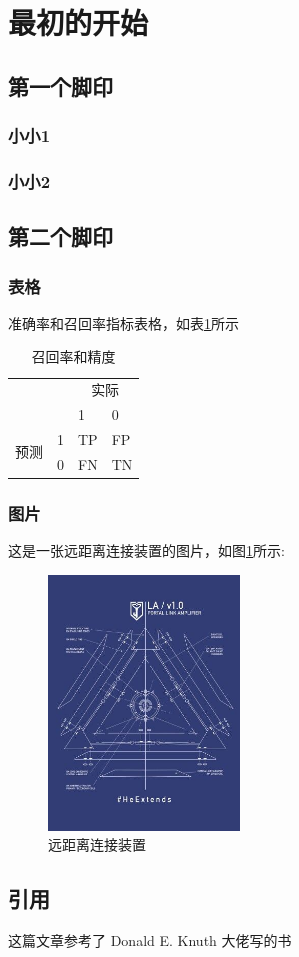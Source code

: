 \section{最初的开始}
\songti
\subsection{第一个脚印}

\subsubsection{小小1}
\subsubsection{小小2}

\subsection{第二个脚印}

\subsubsection{表格}
准确率和召回率指标表格，如表\ref{f1score}所示
\begin{table}[H]
\centering
\begin{tabular}{|ll|ll|}
\hline
\multicolumn{2}{|l|}{\multirow{2}{*}{}}       & \multicolumn{2}{c|}{实际}      \\ \cline{3-4} 
\multicolumn{2}{|l|}{}                        & \multicolumn{1}{l|}{1}  & 0  \\ \hline
\multicolumn{1}{|r|}{\multirow{2}{*}{预测}} & 1 & \multicolumn{1}{l|}{TP} & FP \\ \cline{2-4} 
\multicolumn{1}{|r|}{}                    & 0 & \multicolumn{1}{l|}{FN} & TN \\ \hline
\end{tabular}
\caption{召回率和精度}
\label{f1score}
\end{table}

\subsubsection{图片}
这是一张远距离连接装置的图片，如图\ref{fig_la}所示:
\begin{figure}[H]
	\centering
	\includegraphics[width=2in]{figures/la.jpg}
	\caption{远距离连接装置}
	\label{fig_la}
\end{figure}

\subsection{引用}

这篇文章参考了 Donald E. Knuth 大佬写的书\cite{1989The}
